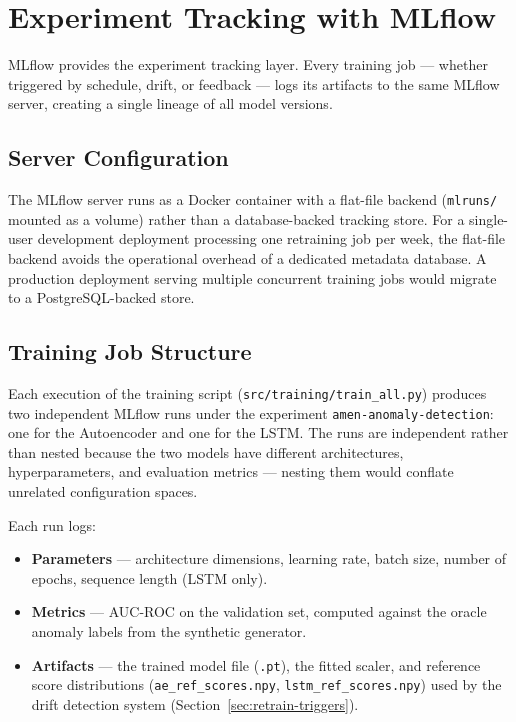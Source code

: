 \section{Experiment Tracking with MLflow}
\label{sec:mlflow}

MLflow provides the experiment tracking layer. Every training job --- whether
triggered by schedule, drift, or feedback --- logs its artifacts to the same
MLflow server, creating a single lineage of all model versions.

\subsection{Server Configuration}

The MLflow server runs as a Docker container with a flat-file backend
(\texttt{mlruns/} mounted as a volume) rather than a database-backed
tracking store. For a single-user development deployment processing one
retraining job per week, the flat-file backend avoids the operational
overhead of a dedicated metadata database. A production deployment serving
multiple concurrent training jobs would migrate to a PostgreSQL-backed store.

\subsection{Training Job Structure}

Each execution of the training script (\texttt{src/training/train\_all.py})
produces two independent MLflow runs under the experiment
\texttt{amen-anomaly-detection}: one for the Autoencoder and one for the
LSTM. The runs are independent rather than nested because the two models
have different architectures, hyperparameters, and evaluation metrics ---
nesting them would conflate unrelated configuration spaces.

Each run logs:

\begin{itemize}
    \item \textbf{Parameters} --- architecture dimensions, learning rate,
          batch size, number of epochs, sequence length (LSTM only).
    \item \textbf{Metrics} --- AUC-ROC on the validation set, computed
          against the oracle anomaly labels from the synthetic generator.
    \item \textbf{Artifacts} --- the trained model file (\texttt{.pt}),
          the fitted scaler, and reference score distributions
          (\texttt{ae\_ref\_scores.npy}, \texttt{lstm\_ref\_scores.npy})
          used by the drift detection system
          (Section~\ref{sec:retrain-triggers}).
\end{itemize}

